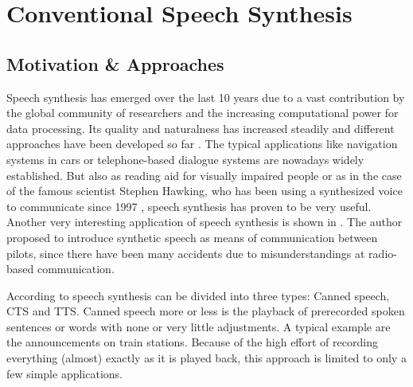 

\section{Conventional Speech Synthesis}
\label{sec:speech}

\subsection{Motivation \& Approaches}
\label{subsec:convenspeech}

Speech synthesis has emerged over the last 10 years due to a vast contribution by the global community of researchers and the increasing computational power for data processing. Its quality and naturalness has increased steadily and different approaches have been developed so far \cite{suendermann:challenges}. The typical applications like navigation systems in cars or telephone-based dialogue systems are nowadays widely established. But also as reading aid for visually impaired people \cite{readspeaker:tts} or as in the case of the famous scientist Stephen Hawking, who has been using a synthesized voice to communicate since 1997 \cite{hawking:speech}, speech synthesis has proven to be very useful. Another very interesting application of speech synthesis is shown in \cite{dhavala:communication}. The author proposed to introduce synthetic speech as means of communication between pilots, since there have been many accidents due to misunderstandings at radio-based communication. %

According to \cite{hinterleitner:quality} speech synthesis can be divided into three types: Canned speech, \ac{CTS} and \ac{TTS}. Canned speech more or less is the playback of prerecorded spoken sentences or words with none or very little adjustments. A typical example are the announcements on train stations. Because of the high effort of recording everything (almost) exactly as it is played back, this approach is limited to only a few simple applications.

